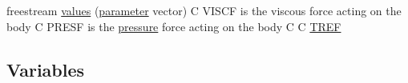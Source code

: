 \begin{DoxyCompactItemize}
freestream \hyperlink{home_2abonfi_2_c_f_d__codes_2_eul_f_s_83_84_2include_2stream_8com_a22b47c1ea15673229d9e1b63dd1c114e}{values} (\hyperlink{msa20_2home_2abonfi_2_c_f_d__codes_2_eul_f_s_83_82_83_2include_2time_8com_ac7fc4dfa4b612e199fef035c5cf70be1}{parameter} vector) C V\-I\-S\-C\-F is the viscous force acting on the body C P\-R\-E\-S\-F is the \hyperlink{msa20_2home_2abonfi_2_c_f_d__codes_2_eul_f_s_83_82_83_2include_2stream_8com_a0facbcffae9f2ce2b94119850b5fc3d3}{pressure} force acting on the body C C \hyperlink{msa20_2home_2abonfi_2_c_f_d__codes_2_eul_f_s_83_82_83_2include_2stream_8com_a8c4a60ca1b033fbd4e2cadaf15146ca5}{T\-R\-E\-F}
\end{DoxyCompactItemize}
\subsection*{Variables}
